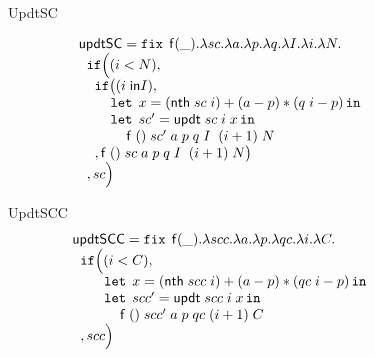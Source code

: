 \documentclass[a4paper,11pt]{article}
\theoremstyle{definition}
\begin{document}
\begin{figure}
\[\begin{array}{l}
\end{array}
\]

UpdtSC

\[
\begin{array}{l}
 \mathsf{updtSC} = \mathop{\mathtt{fix}} \;  \mathsf{f}(\_). \lambda sc. \lambda a. \lambda
  p. \lambda q.  \lambda I. \lambda i. \lambda N. \\
 \hspace{.2cm} \mathtt{if}   \Big (   (i < N)  ,  \\
 \hspace{0.4cm}  \mathtt{if} \big( ( i \; \mathsf{in} I  ) ,       \\
 \hspace{0.8cm} \mathop{\mathtt{let}} \; x =( \mathsf{nth} \; sc \; i) + (a-p)*(q
  \; i - p)  \mathop{ \mathtt{in}} \\
 \hspace{0.8cm} \mathop{\mathtt{let}} \; sc' =  \mathsf{updt} \; sc \; i
  \; x \mathop{ \mathtt{in}} \\
  \hspace{1.2cm} \mathsf{f}  \; () \; sc' \; a \; p
 \; q \; I \;  \; (i+1) \;  N  \\ 
\hspace{0.4cm}  ,  \mathsf{f}  \; () \; sc \; a \; p
 \; q \; I \;  \; (i+1) \;  N \big )  \\ 
\hspace{0.2cm}   ,  sc  \Big ) \\
 
\end{array}
\]

UpdtSCC
\[
\begin{array}{l}
 \mathsf{updtSCC} = \mathop{\mathtt{fix}} \;  \mathsf{f}(\_). \lambda scc. \lambda a. \lambda
  p. \lambda qc.  \lambda i. \lambda C. \\
 \hspace{.2cm} \mathtt{if}   \Big (   (i < C)  ,  \\
 \hspace{0.8cm} \mathop{\mathtt{let}} \; x =( \mathsf{nth} \; scc \; i) + (a-p)*(qc
  \; i - p)  \mathop{ \mathtt{in}} \\
 \hspace{0.8cm} \mathop{\mathtt{let}} \; scc' =  \mathsf{updt} \; scc \; i
  \; x \mathop{ \mathtt{in}} \\
  \hspace{1.2cm} \mathsf{f}  \; () \; scc' \; a \; p
 \; qc   \; (i+1) \;  C  \\ 
\hspace{0.2cm}   ,  scc  \Big ) \\
 

\end{array}\]
\end{figure}
\end{document}
